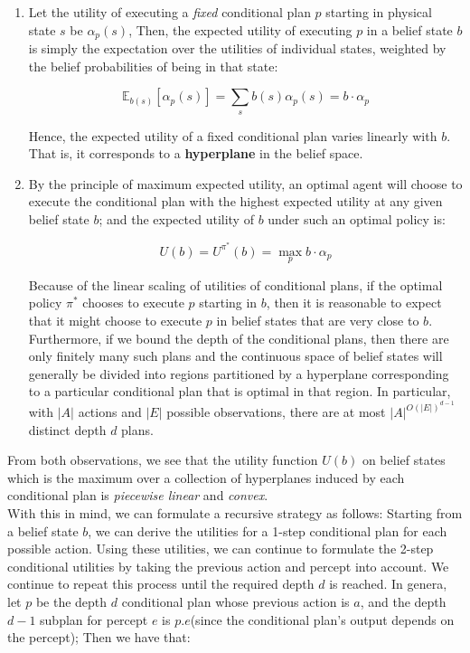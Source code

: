 \documentclass[11pt]{article}
\begin{document}
\begin{enumerate}
    \item Let the utility of executing a \textit{fixed} conditional plan $p$ starting in physical state $s$ be $\alpha_p(s)$, Then, the expected utility of executing $p$ in a belief state $b$ is simply the expectation over the utilities of individual states, weighted by the belief probabilities of being in that state:
    
    $$
    \mathbb{E}_{b(s)}[\alpha_p(s)] = \sum_s b(s) \alpha_p(s) = b \cdot \alpha_p
    $$
    
    Hence, the expected utility of a fixed conditional plan varies linearly with $b$. That is, it corresponds to a \textbf{hyperplane} in the belief space.
    
    \item By the principle of maximum expected utility, an optimal agent will choose to execute the conditional plan with the highest expected utility at any given belief state $b$; and the expected utility of $b$ under such an optimal policy is:
    
    $$
    U(b) = U^{\pi^*}(b) = \max_p b\cdot \alpha_p
    $$
    
    Because of the linear scaling of utilities of conditional plans, if the optimal policy $\pi^*$ chooses to execute $p$ starting in $b$, then it is reasonable to expect that it might choose to execute $p$ in belief states that are very close to $b$. Furthermore, if we bound the depth of the conditional plans, then there are only finitely many such plans and the continuous space of belief states will generally be divided into regions partitioned by a hyperplane corresponding to a particular conditional plan that is optimal in that region. In particular, with $|A|$ actions and $|E|$ possible observations, there are at most $|A|^{O(|E|)^{d-1}}$ distinct depth $d$ plans.
\end{enumerate}

From both observations, we see that the utility function $U(b)$ on belief states which is the maximum over a collection of hyperplanes induced by each conditional plan is \textit{piecewise linear} and \textit{convex}. \\

With this in mind, we can formulate a recursive strategy as follows: Starting from a belief state $b$, we can derive the utilities for a 1-step conditional plan for each possible action. Using these utilities, we can continue to formulate the 2-step conditional utilities by taking the previous action and percept into account. We continue to repeat this process until the required depth $d$ is reached. In genera, let $p$ be the depth $d$ conditional plan whose previous action is $a$, and the depth $d-1$ subplan for percept $e$ is $p.e$(since the conditional plan's output depends on the percept); Then we have that:
\end{document}
